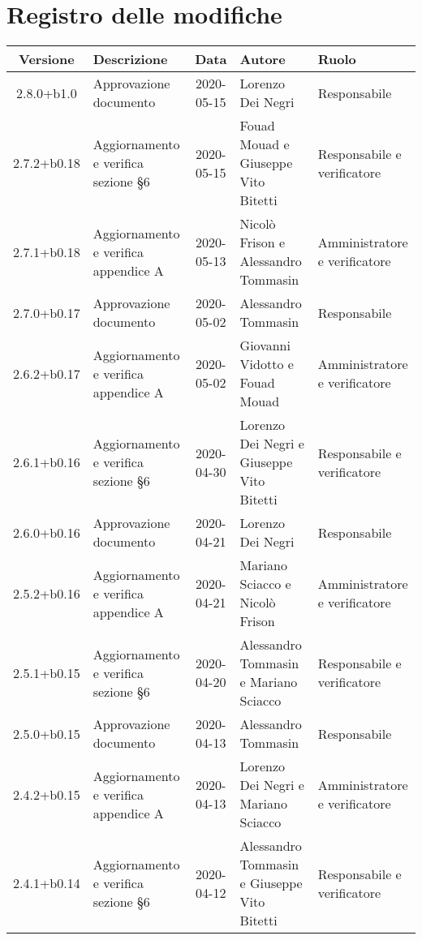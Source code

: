 \section*{Registro delle modifiche}

\begin{center}
	\begin{longtable}{|c|p{3.5cm}|c|p{3cm}|p{3cm}|}
	\hline
	\rowcolor{lighter-grayer}
	\textbf{Versione} & \textbf{Descrizione} & \textbf{Data} & \textbf{Autore} & \textbf{Ruolo} \\
	\hline
	\endfirsthead

	2.8.0+b1.0 & Approvazione documento & 2020-05-15 & Lorenzo Dei Negri & Responsabile \\
	\hline
	2.7.2+b0.18 & Aggiornamento e verifica sezione \S6 & 2020-05-15 & Fouad Mouad e Giuseppe Vito Bitetti & Responsabile e verificatore \\
	\hline
	2.7.1+b0.18 & Aggiornamento e verifica appendice A & 2020-05-13 & Nicolò Frison e Alessandro Tommasin & Amministratore e verificatore \\
	\hline
	
	
	2.7.0+b0.17 & Approvazione documento & 2020-05-02 & Alessandro Tommasin & Responsabile \\
	\hline
	2.6.2+b0.17 & Aggiornamento e verifica appendice A & 2020-05-02 & Giovanni Vidotto e Fouad Mouad & Amministratore e verificatore \\
	\hline
	2.6.1+b0.16 & Aggiornamento e verifica sezione \S6 & 2020-04-30 & Lorenzo Dei Negri e Giuseppe Vito Bitetti & Responsabile e verificatore \\
	\hline
	
	2.6.0+b0.16 & Approvazione documento & 2020-04-21 & Lorenzo Dei Negri & Responsabile \\
	\hline
	2.5.2+b0.16 & Aggiornamento e verifica appendice A & 2020-04-21 & Mariano Sciacco e Nicolò Frison & Amministratore e verificatore \\
	\hline
	2.5.1+b0.15 & Aggiornamento e verifica sezione \S6 & 2020-04-20 & Alessandro Tommasin e Mariano Sciacco & Responsabile e verificatore \\
	\hline
	
	2.5.0+b0.15 & Approvazione documento & 2020-04-13 & Alessandro Tommasin & Responsabile \\
	\hline
	2.4.2+b0.15 & Aggiornamento e verifica appendice A & 2020-04-13 & Lorenzo Dei Negri e Mariano Sciacco & Amministratore e verificatore \\
	\hline
	2.4.1+b0.14 & Aggiornamento e verifica sezione \S6 & 2020-04-12 & Alessandro Tommasin e Giuseppe Vito Bitetti & Responsabile e verificatore \\
	\hline
	

\end{longtable}
\end{center}
